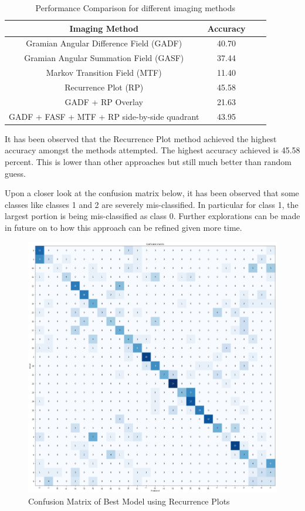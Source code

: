 \documentclass[conference]{IEEEtran}
\begin{document}
\begin{table}[H] 
\begin{center}
\caption{Performance Comparison for different imaging methods} \label{tbl:compare_cnn}
\begin{tabular}{|c|c|c|c|}
\hline
Imaging Method & Accuracy \\
\hline
Gramian Angular Difference Field (GADF)  & 40.70  \\
\hline
Gramian Angular Summation Field (GASF) & 37.44  \\
\hline
Markov Transition Field (MTF) & 11.40  \\
\hline
Recurrence Plot (RP) & 45.58  \\
\hline
GADF + RP Overlay & 21.63  \\
\hline
GADF + FASF + MTF + RP side-by-side quadrant & 43.95  \\
\hline
\end{tabular}
\end{center}
\end{table}

It has been observed that the Recurrence Plot method achieved the highest accuracy amongst the methods attempted. The highest accuracy achieved is 45.58 percent. This is lower than other approaches but still much better than random guess.

Upon a closer look at the confusion matrix below, it has been observed that some classes like classes 1 and 2 are severely mis-classified. In particular for class 1, the largest portion is being mis-classified as class 0. Further explorations can be made in future on to how this approach can be refined given more time.

\begin{figure}[H]
\begin{center}
\includegraphics[scale=0.15]{Image/rp_confusion.png}
\caption{\label{rp_confusion} Confusion Matrix of Best Model using Recurrence Plots}
\end{center}
\end{figure}
\end{document}
